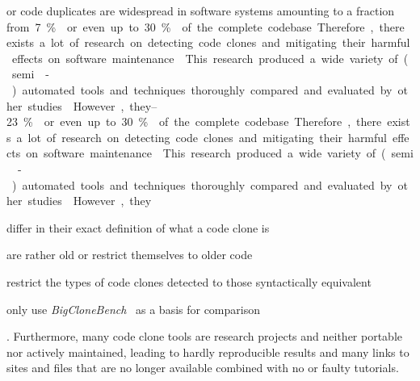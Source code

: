 \documentclass[10pt,journal,compsoc]{IEEEtran}
\begin{document}
\maketitle

\IEEEdisplaynontitleabstractindextext

\IEEEpeerreviewmaketitle




 or code duplicates are widespread in software systems amounting to a fraction from~\qtyrange{7}{23}\percent~\cite{roy2009comparison,schulze2010code} or even up to \qty{30}\percent~\cite{wagner2013software,wagner2016functionally,kim2005empirical} of the complete codebase.
Therefore, there exists a lot of research on detecting code clones and mitigating their harmful effects on software maintenance~\cite{juergens2009code}. This research produced a wide
variety of (semi\nobreakdash-)automated tools and techniques thoroughly compared and evaluated by other studies~\cite{roy2009comparison,ain2019systematic}.
However, they \begin{inlist}
  \item differ in their exact definition of what a code clone is
  \item are rather old or restrict themselves to older code
  \item restrict the types of code clones detected to those syntactically equivalent
  \item only use \textsl{BigCloneBench}~\cite{svajlenko2021bigclonebench} as a basis for comparison
\end{inlist}.
Furthermore, many code clone tools are research projects and neither portable nor actively maintained, leading to hardly reproducible results and many links to sites and files that are no longer available combined with no or faulty tutorials.
\end{document}
